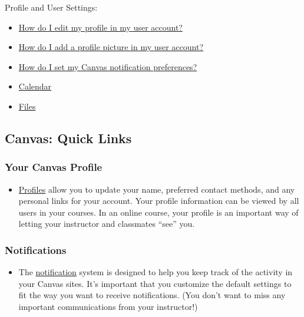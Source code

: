 Profile and User Settings:

\begin{itemize}
\item
  \href{https://community.canvaslms.com/t5/Student-Guide/How-do-I-edit-my-profile-in-my-user-account-as-a-student/ta-p/421}{How do I edit my profile in my user account?}
\item
  \href{https://community.canvaslms.com/t5/Student-Guide/How-do-I-add-a-profile-picture-in-my-user-account-as-a-student/ta-p/518}{How do I add a profile picture in my user account?}
\item
  \href{https://community.canvaslms.com/t5/Student-Guide/How-do-I-manage-my-Canvas-notification-settings-as-a-student/ta-p/434}{How do I set my Canvas notification preferences?}
\item
  \href{https://vimeo.com/78015141}{Calendar}
\item
  \href{https://vimeo.com/74772644}{Files}
\end{itemize}

\hypertarget{canvas-quick-links}{%
\subsection{Canvas: Quick Links}\label{canvas-quick-links}}

\hypertarget{your-canvas-profile}{%
\subsubsection{Your Canvas Profile}\label{your-canvas-profile}}

\begin{itemize}
\tightlist
\item
  \href{https://community.canvaslms.com/t5/Student-Guide/How-do-I-edit-my-profile-in-my-user-account-as-a-student/ta-p/421}{Profiles} allow you to update your name, preferred contact methods, and any personal links for your account. Your profile information can be viewed by all users in your courses. In an online course, your profile is an important way of letting your instructor and classmates ``see'' you.
\end{itemize}

\hypertarget{notifications}{%
\subsubsection{Notifications}\label{notifications}}

\begin{itemize}
\tightlist
\item
  The \href{https://community.canvaslms.com/t5/Student-Guide/How-do-I-manage-my-Canvas-notification-settings-as-a-student/ta-p/434}{notification} system is designed to help you keep track of the activity in your Canvas sites. It's important that you customize the default settings to fit the way you want to receive notifications. (You don't want to miss any important communications from your instructor!)
\end{itemize}

